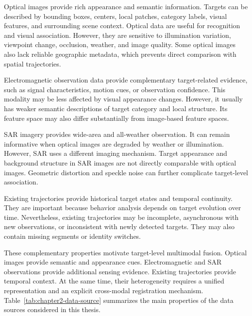 Optical images provide rich appearance and semantic information. Targets can be described by bounding boxes, centers, local patches, category labels, visual features, and surrounding scene context. Optical data are useful for recognition and visual association. However, they are sensitive to illumination variation, viewpoint change, occlusion, weather, and image quality. Some optical images also lack reliable geographic metadata, which prevents direct comparison with spatial trajectories.

Electromagnetic observation data provide complementary target-related evidence, such as signal characteristics, motion cues, or observation confidence. This modality may be less affected by visual appearance changes. However, it usually has weaker semantic descriptions of target category and local structure. Its feature space may also differ substantially from image-based feature spaces.

SAR imagery provides wide-area and all-weather observation. It can remain informative when optical images are degraded by weather or illumination. However, SAR uses a different imaging mechanism. Target appearance and background structure in SAR images are not directly comparable with optical images. Geometric distortion and speckle noise can further complicate target-level association.

Existing trajectories provide historical target states and temporal continuity. They are important because behavior analysis depends on target evolution over time. Nevertheless, existing trajectories may be incomplete, asynchronous with new observations, or inconsistent with newly detected targets. They may also contain missing segments or identity switches.

These complementary properties motivate target-level multimodal fusion. Optical images provide semantic and appearance cues. Electromagnetic and SAR observations provide additional sensing evidence. Existing trajectories provide temporal context. At the same time, their heterogeneity requires a unified representation and an explicit cross-modal registration mechanism. Table~\ref{tab:chapter2-data-source} summarizes the main properties of the data sources considered in this thesis.

